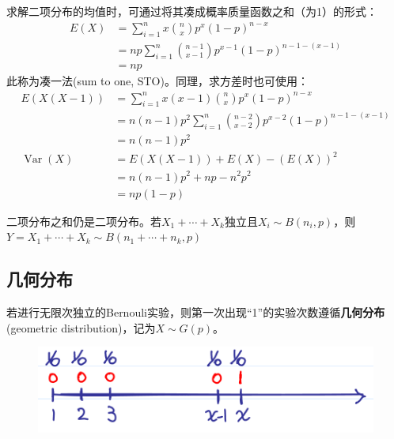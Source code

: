 \begin{note}
    求解二项分布的均值时，可通过将其凑成概率质量函数之和（为1）的形式：
    \begin{align*}
        E(X) & =\sum_{i=1}^n x \binom{n}{x} p^x (1-p)^{n-x}                 \\
             & = np \sum_{i=1}^n \binom{n-1}{x-1} p^{x-1} (1-p)^{n-1-(x-1)} \\
             & =np
    \end{align*}
    此称为凑一法(sum to one, STO)。同理，求方差时也可使用：
    \begin{align*}
        E(X(X-1))             & =\sum_{i=1}^n x(x-1) \binom{n}{x} p^x (1-p)^{n-x}                   \\
                              & = n(n-1)p^2 \sum_{i=1}^n \binom{n-2}{x-2} p^{x-2} (1-p)^{n-1-(x-1)} \\
                              & =n(n-1)p^2                                                          \\
        \operatorname{Var}(X) & =  E(X(X-1)) + E(X) - (E(X))^2                                      \\
                              & = n(n-1)p^2 + np -n^2 p^2                                           \\
                              & =np(1-p)
    \end{align*}
\end{note}

\begin{proposition}
    二项分布之和仍是二项分布。若$X_1+\cdots+X_k$独立且$X_i \sim B(n_i,p)$，则$Y=X_1+\cdots+X_k  \sim B(n_1+\cdots+n_k,p )$
\end{proposition}

\subsection{几何分布}

\begin{definition}
    若进行无限次独立的Bernouli实验，则第一次出现“1”的实验次数遵循\textbf{几何分布}(geometric distribution)，记为$X \sim G(p)$。
\end{definition}

\begin{figure}[h]
    \centering
    \includegraphics{image/geometric_dist_intu.png}
\end{figure}

